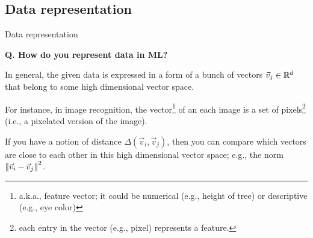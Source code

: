 

\subsection{Data representation}
\begin{transitionsubframe}
  \begin{center}
    \Huge Data representation
  \end{center}
\end{transitionsubframe}

\begin{frame}[fragile]{\textbf{Q. How do you represent data in ML?}}
  \begin{wideitemize}
    \item In general, the given data is expressed in a form of a bunch of vectors
    $\vec{v}_{j} \in {\Bbb R}^{d}$ that belong to some high dimensional vector space.
    \item For instance, in image recognition, the vector\footnote{a.k.a., feature
    vector; it could be numerical (e.g., height of tree) or descriptive
    (e.g., eye color)} of an each image is a set of pixels\footnote{each entry
    in the vector (e.g., pixel) represents a feature.} (i.e., a pixelated
    version of the image).
    \item If you have a notion of distance $\Delta(\vec{v}_{i}, \vec{v}_{j})$,
    then you can compare which vectors are close to each other in this high
    dimensional vector space; e.g., the norm $\left\lVert \vec{v}_{i} - \vec{v}_{j} \right\rVert^2$.
  \end{wideitemize}
\end{frame}

